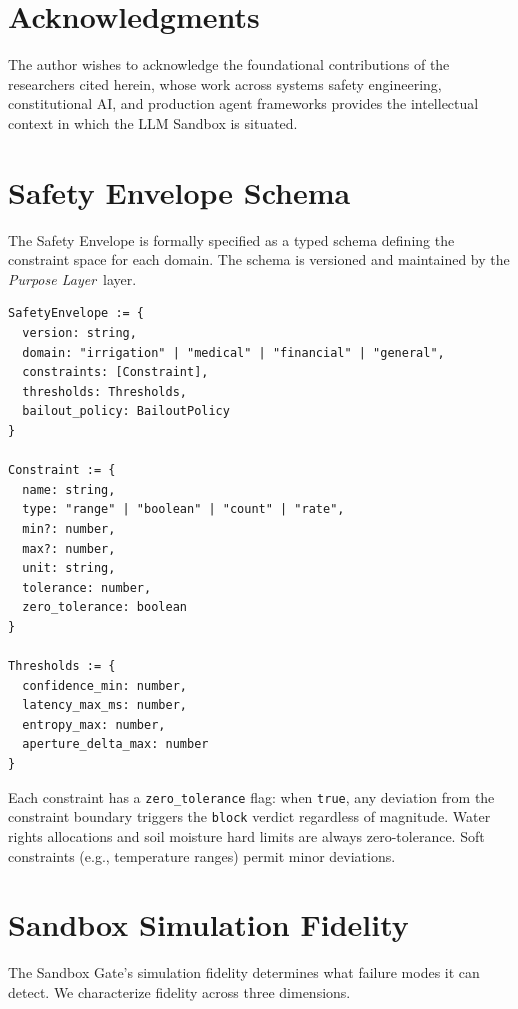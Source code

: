 \documentclass[12pt]{article}
\newcommand{\purpose}{\textit{Purpose Layer}}
\begin{document}
\section*{Acknowledgments}

The author wishes to acknowledge the foundational contributions of the researchers cited herein, whose work across systems safety engineering, constitutional AI, and production agent frameworks provides the intellectual context in which the LLM Sandbox is situated.


\section{Safety Envelope Schema}
\label{sec:safety-envelope-schema}

The Safety Envelope is formally specified as a typed schema defining the constraint space for each domain. The schema is versioned and maintained by the \purpose\ layer.

\begin{verbatim}
SafetyEnvelope := {
  version: string,
  domain: "irrigation" | "medical" | "financial" | "general",
  constraints: [Constraint],
  thresholds: Thresholds,
  bailout_policy: BailoutPolicy
}

Constraint := {
  name: string,
  type: "range" | "boolean" | "count" | "rate",
  min?: number,
  max?: number,
  unit: string,
  tolerance: number,
  zero_tolerance: boolean
}

Thresholds := {
  confidence_min: number,
  latency_max_ms: number,
  entropy_max: number,
  aperture_delta_max: number
}
\end{verbatim}

Each constraint has a \texttt{zero\_tolerance} flag: when \texttt{true}, any deviation from the constraint boundary triggers the \texttt{block} verdict regardless of magnitude. Water rights allocations and soil moisture hard limits are always zero-tolerance. Soft constraints (e.g., temperature ranges) permit minor deviations.

\section{Sandbox Simulation Fidelity}
\label{sec:simulation-fidelity}

The Sandbox Gate's simulation fidelity determines what failure modes it can detect. We characterize fidelity across three dimensions.
\end{document}
